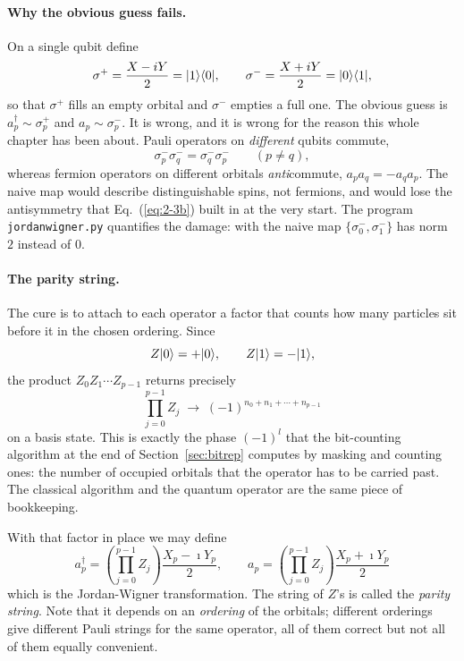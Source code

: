 \paragraph{Why the obvious guess fails.}
On a single qubit define
\begin{equation}
  \sigma^{+} = \frac{X-i Y}{2} = \vert 1 \rangle\langle 0 \vert,
  \qquad
  \sigma^{-} = \frac{X+i Y}{2} = \vert 0 \rangle\langle 1 \vert,
  \label{eq:3-sigmapm}
\end{equation}
so that $\sigma^{+}$ fills an empty orbital and $\sigma^{-}$ empties a full
one.  The obvious guess is $a_p^{\dagger}\sim\sigma_p^{+}$ and
$a_p\sim\sigma_p^{-}$.  It is wrong, and it is wrong for the reason this
whole chapter has been about.  Pauli operators on \emph{different} qubits
commute,
\[
  \sigma_p^{-}\sigma_q^{-} = \sigma_q^{-}\sigma_p^{-}
  \qquad (p\ne q),
\]
whereas fermion operators on different orbitals \emph{anti}commute,
$a_pa_q=-a_qa_p$.  The naive map would describe distinguishable spins, not
fermions, and would lose the antisymmetry that
Eq.~(\ref{eq:2-3b}) built in at the very start.  The program
\texttt{jordanwigner.py} quantifies the damage: with the naive map
$\{\sigma_0^{-},\sigma_1^{-}\}$ has norm $2$ instead of $0$.

\paragraph{The parity string.}
The cure is to attach to each operator a factor that counts how many
particles sit before it in the chosen ordering.  Since
\[
  Z\vert 0 \rangle=+\vert 0 \rangle,
  \qquad
  Z\vert 1 \rangle=-\vert 1 \rangle,
\]
the product $Z_0Z_1\cdots Z_{p-1}$ returns precisely
\begin{equation}
  \prod_{j=0}^{p-1}Z_j \;\longrightarrow\; (-1)^{n_0+n_1+\cdots+n_{p-1}}
  \label{eq:3-paritystring}
\end{equation}
on a basis state.  This is exactly the phase $(-1)^{l}$ that the bit-counting
algorithm at the end of Section~\ref{sec:bitrep} computes by masking and
counting ones: the number of occupied orbitals that the operator has to be
carried past.  The classical algorithm and the quantum operator are the same
piece of bookkeeping.

With that factor in place we may define
\begin{equation}
  \boxed{\;
  a_p^{\dagger}
   = \left(\prod_{j=0}^{p-1}Z_j\right)\frac{X_p-\imath Y_p}{2},
  \qquad
  a_p
   = \left(\prod_{j=0}^{p-1}Z_j\right)\frac{X_p+\imath Y_p}{2} \;}
  \label{eq:3-jwmap}
\end{equation}
which is the Jordan-Wigner transformation.  The string of $Z$'s is called the
\emph{parity string}.  Note that it depends on an \emph{ordering} of the
orbitals; different orderings give different Pauli strings for the same
operator, all of them correct but not all of them equally convenient.

